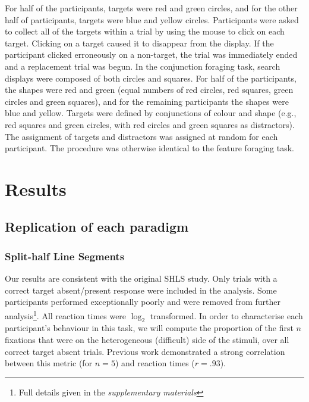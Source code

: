 \documentclass[]{rsos}%
\begin{document}
For half of the participants, targets were red and green circles, and for the other half of participants, targets were blue and yellow circles. Participants were asked to collect all of the targets within a trial by using the mouse to click on each target. Clicking on a target caused it to disappear from the display. If the participant clicked erroneously on a non-target, the trial was immediately ended and a replacement trial was begun. In the conjunction foraging task, search displays were composed of both circles and squares. For half of the participants, the shapes were red and green (equal numbers of red circles, red squares, green circles and green squares), and for the remaining participants the shapes were blue and yellow. Targets were defined by conjunctions of colour and shape (e.g., red squares and green circles, with red circles and green squares as distractors). The assignment of targets and distractors was assigned at random for each participant. The procedure was otherwise identical to the feature foraging task. 

\section{Results}

\subsection{Replication of each paradigm}

\subsubsection{Split-half Line Segments}

Our results are consistent with the original SHLS study\cite{nowakowska2017}. Only trials with a correct target absent/present response were included in the analysis. Some participants performed exceptionally poorly and were removed from further analysis\footnote{Full details given in the \textit{supplementary materials}}. All reaction times were $\log_2$ transformed. In order to characterise each participant's behaviour in this task, we will compute the proportion of the first $n$ fixations that were on the heterogeneous (difficult) side of the stimuli, over all correct target absent trials. Previous work\cite{nowakowska2017} demonstrated a strong correlation between this metric (for $n=5$) and reaction times ($r=.93$).
\end{document}
